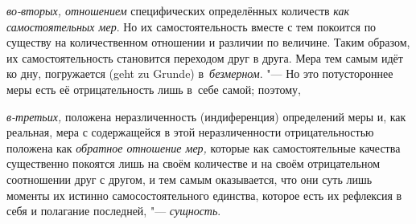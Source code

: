 {\em во-вторых, отношением} специфических определённых количеств
{\em как самостоятельных мер}. Но их самостоятельность вместе с тем покоится по
существу на количественном отношении и различии по величине. Таким образом, их
самостоятельность становится переходом друг в друга. Мера тем самым идёт ко
дну, погружается (geht zu Grunde) в~{\em безмерном}. "--- Но это потустороннее
меры есть её отрицательность лишь в~себе самой; поэтому,

{\em в-третьих,} положена неразличенность (индиференция) определений меры и,
как реальная, мера с содержащейся в этой неразличенности отрицательностью
положена как {\em обратное отношение мер,} которые как самостоятельные качества
существенно покоятся лишь на своём количестве и на своём отрицательном
соотношении друг с другом, и тем самым оказывается, что они суть лишь моменты
их истинно самосостоятельного единства, которое есть их рефлексия в себя и
полагание последней, "--- {\em сущность}.

